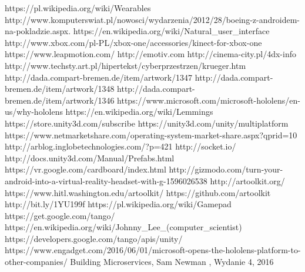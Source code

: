 \documentclass[12pt]{article}
\begin{document}
\begin{thebibliography}{2}
 https://pl.wikipedia.org/wiki/Wearables
 http://www.komputerswiat.pl/nowosci/wydarzenia/2012/28/boeing-z-androidem-na-pokladzie.aspx.
 https://en.wikipedia.org/wiki/Natural\_user\_interface
 http://www.xbox.com/pl-PL/xbox-one/accessories/kinect-for-xbox-one
 https://www.leapmotion.com/
 http://emotiv.com
 http://cinema-city.pl/4dx-info
 http://www.techsty.art.pl/hipertekst/cyberprzestrzen/krueger.htm
 http://dada.compart-bremen.de/item/artwork/1347
 http://dada.compart-bremen.de/item/artwork/1348
 http://dada.compart-bremen.de/item/artwork/1346
 https://www.microsoft.com/microsoft-hololens/en-us/why-hololens
 https://en.wikipedia.org/wiki/Lemmings
 https://store.unity3d.com/subscribe
 https://unity3d.com/unity/multiplatform
 https://www.netmarketshare.com/operating-system-market-share.aspx?qprid=10
 http://arblog.inglobetechnologies.com/?p=421
 http://socket.io/
 http://docs.unity3d.com/Manual/Prefabs.html
 https://vr.google.com/cardboard/index.html
 http://gizmodo.com/turn-your-android-into-a-virtual-reality-headset-with-g-1596026538
 http://artoolkit.org/
 https://www.hitl.washington.edu/artoolkit/
 https://github.com/artoolkit
 http://bit.ly/1YU199f
 https://pl.wikipedia.org/wiki/Gamepad
 https://get.google.com/tango/
 https://en.wikipedia.org/wiki/Johnny\_Lee\_(computer\_scientist)
 https://developers.google.com/tango/apis/unity/
 https://www.engadget.com/2016/06/01/microsoft-opens-the-hololens-platform-to-other-companies/
 Building Microservices,  Sam Newman , Wydanie 4, 2016
\end{thebibliography}
\end{document}

